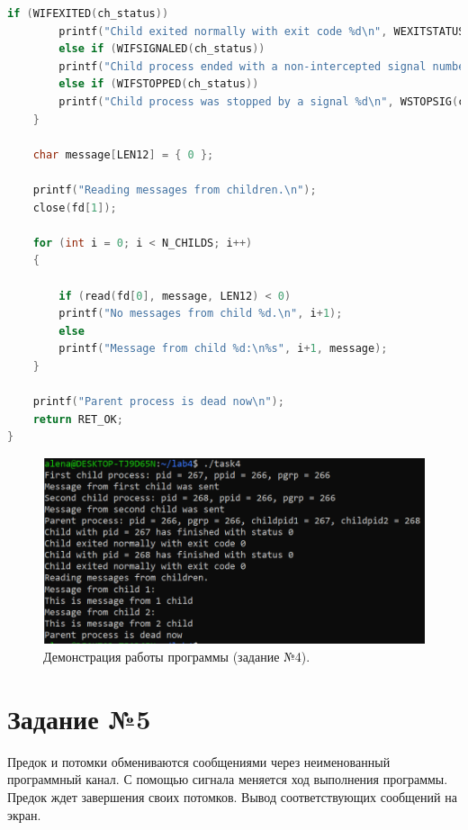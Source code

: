 \documentclass[12pt]{report}
\begin{document}
\begin{lstlisting}[label=some-code,caption=Код программы к заданию №4,language=C]
		if (WIFEXITED(ch_status))
		printf("Child exited normally with exit code %d\n", WEXITSTATUS(ch_status));
		else if (WIFSIGNALED(ch_status))
		printf("Child process ended with a non-intercepted signal number %d\n", WTERMSIG(ch_status));
		else if (WIFSTOPPED(ch_status))
		printf("Child process was stopped by a signal %d\n", WSTOPSIG(ch_status));
	}
	
	char message[LEN12] = { 0 };
	
	printf("Reading messages from children.\n");
	close(fd[1]);
	
	for (int i = 0; i < N_CHILDS; i++)
	{
		
		if (read(fd[0], message, LEN12) < 0)
		printf("No messages from child %d.\n", i+1);
		else
		printf("Message from child %d:\n%s", i+1, message);
	}
	
	printf("Parent process is dead now\n");
	return RET_OK;
}
\end{lstlisting}

\begin{figure}[H]

	\centering

	\includegraphics[width=\linewidth]{img/task04.png}
	\caption{Демонстрация работы программы (задание №4).}

	\label{fig:task04}

\end{figure}

\section*{Задание №5}

Предок и потомки обмениваются сообщениями через неименованный программный канал. С помощью сигнала меняется ход выполнения программы. Предок ждет завершения своих потомков. Вывод соответствующих сообщений на экран.
\end{document}
